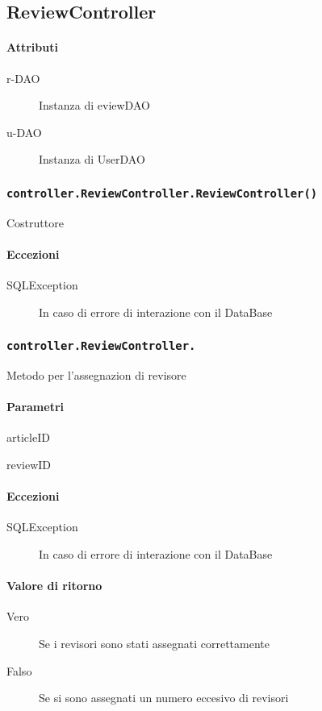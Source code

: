 \subsection{ReviewController}
\paragraph{Attributi}
\begin{description}
\item[r-DAO] Instanza di eviewDAO
\item[u-DAO] Instanza di UserDAO
\end{description}

\subsubsection{\texttt{controller.ReviewController.ReviewController()}}
Costruttore
\paragraph{Eccezioni}
\begin{description}
\item[SQLException] In caso di errore di interazione con il DataBase
\end{description}


\subsubsection{\texttt{controller.ReviewController.}}
Metodo per l'assegnazion di revisore
\paragraph{Parametri}
\begin{description}
\item articleID
\item reviewID
\end{description}
\paragraph{Eccezioni}
\begin{description}
\item[SQLException] In caso di errore di interazione con il DataBase
\end{description}
\paragraph{Valore di ritorno}
\begin{description}
\item[Vero] Se i revisori sono stati assegnati correttamente 
\item[Falso] Se si sono assegnati un numero eccesivo di revisori
\end{description}



